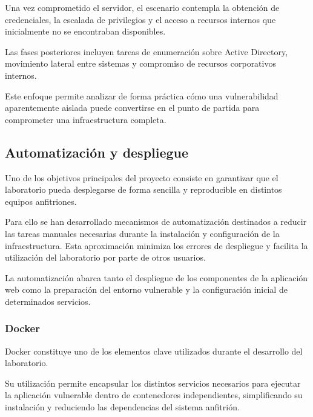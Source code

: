 Una vez comprometido el servidor, el escenario contempla la obtención de credenciales, la escalada de privilegios y el acceso a recursos internos que inicialmente no se encontraban disponibles.

Las fases posteriores incluyen tareas de enumeración sobre Active Directory, movimiento lateral entre sistemas y compromiso de recursos corporativos internos.

Este enfoque permite analizar de forma práctica cómo una vulnerabilidad aparentemente aislada puede convertirse en el punto de partida para comprometer una infraestructura completa.


\subsection{Automatización y despliegue}

Uno de los objetivos principales del proyecto consiste en garantizar que el laboratorio pueda desplegarse de forma sencilla y reproducible en distintos equipos anfitriones.

Para ello se han desarrollado mecanismos de automatización destinados a reducir las tareas manuales necesarias durante la instalación y configuración de la infraestructura. Esta aproximación minimiza los errores de despliegue y facilita la utilización del laboratorio por parte de otros usuarios.

La automatización abarca tanto el despliegue de los componentes de la aplicación web como la preparación del entorno vulnerable y la configuración inicial de determinados servicios.

\subsubsection{Docker}

Docker constituye uno de los elementos clave utilizados durante el desarrollo del laboratorio.

Su utilización permite encapsular los distintos servicios necesarios para ejecutar la aplicación vulnerable dentro de contenedores independientes, simplificando su instalación y reduciendo las dependencias del sistema anfitrión.

